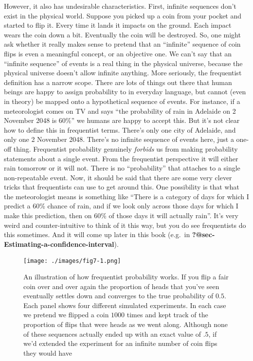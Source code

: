 \documentclass[
  letterpaper,
]{book}
\begin{document}
However, it also has undesirable characteristics. First, infinite
sequences don't exist in the physical world. Suppose you picked up a
coin from your pocket and started to flip it. Every time it lands it
impacts on the ground. Each impact wears the coin down a bit. Eventually
the coin will be destroyed. So, one might ask whether it really makes
sense to pretend that an ``infinite'' sequence of coin flips is even a
meaningful concept, or an objective one. We can't say that an ``infinite
sequence'' of events is a real thing in the physical universe, because
the physical universe doesn't allow infinite anything. More seriously,
the frequentist definition has a narrow scope. There are lots of things
out there that human beings are happy to assign probability to in
everyday language, but cannot (even in theory) be mapped onto a
hypothetical sequence of events. For instance, if a meteorologist comes
on TV and says ``the probability of rain in Adelaide on 2 November 2048
is 60\%'' we humans are happy to accept this. But it's not clear how to
define this in frequentist terms. There's only one city of Adelaide, and
only one 2 November 2048. There's no infinite sequence of events here,
just a one-off thing. Frequentist probability genuinely \emph{forbids}
us from making probability statements about a single event. From the
frequentist perspective it will either rain tomorrow or it will not.
There is no ``probability'' that attaches to a single non-repeatable
event. Now, it should be said that there are some very clever tricks
that frequentists can use to get around this. One possibility is that
what the meteorologist means is something like ``There is a category of
days for which I predict a 60\% chance of rain, and if we look only
across those days for which I make this prediction, then on 60\% of
those days it will actually rain''. It's very weird and
counter-intuitive to think of it this way, but you do see frequentists
do this sometimes. And it will come up later in this book (e.g.~in
\textbf{?@sec-Estimating-a-confidence-interval}).

\begin{figure}

\texttt{[image: ./images/fig7-1.png]} \hfill{}

\caption{\label{fig-fig7-1}An illustration of how frequentist
probability works. If you flip a fair coin over and over again the
proportion of heads that you've seen eventually settles down and
converges to the true probability of \(0.5\). Each panel shows four
different simulated experiments. In each case we pretend we flipped a
coin \(1000\) times and kept track of the proportion of flips that were
heads as we went along. Although none of these sequences actually ended
up with an exact value of \(.5\), if we'd extended the experiment for an
infinite number of coin flips they would have}

\end{figure}
\end{document}
